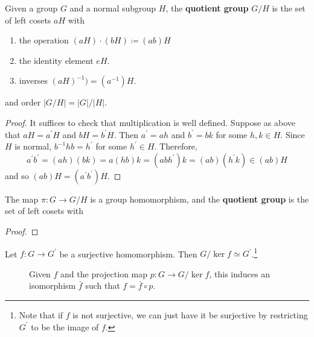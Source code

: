   \begin{definition}
    Given a group $G$ and a normal subgroup $H$, the \textbf{quotient group} $G/H$ is the set of left cosets $aH$ with 
    \begin{enumerate}
      \item the operation $(aH) \cdot (bH) \coloneqq (ab)H$ 
      \item the identity element $eH$. 
      \item inverses $(aH)^{-1}) = (a^{-1})H$. 
    \end{enumerate}
    and order $|G/H| = |G| / |H|$.  
  \end{definition}
  \begin{proof}
    It suffices to check that multiplication is well defined. Suppose as above that $aH = a^\prime H$ and $bH = b^\prime H$. Then $a^\prime = ah$ and $b^\prime = bk$ for some $h, k \in H$. Since $H$ is normal, $b^{-1} h b = h^\prime$ for some $h^\prime \in H$. Therefore, 
    \begin{equation}
      a^\prime b^\prime = (ah) (bk) = a(hb) k = (ab h^\prime) k = (ab)(h^\prime k) \in (ab) H
    \end{equation}
    and so $(ab)H = (a^\prime b^\prime)H$. 
  \end{proof}

  \begin{theorem}
    The map $\pi: G \rightarrow G/H$ is a group homomorphism, and the \textbf{quotient group} is the set of left cosets with 
  \end{theorem}
  \begin{proof}
    
  \end{proof} 

  \begin{theorem}
    Let $f: G \to G^\prime$ be a surjective homomorphism. Then $G/{\ker{f}} \simeq G^\prime$.\footnote{Note that if $f$ is not surjective, we can just have it be surjective by restricting $G^\prime$ to be the image of $f$. }

    \begin{figure}[H]
      \centering 
      \caption{Given $f$ and the projection map $p: G \to G/{\ker{f}}$, this induces an isomorphism $\bar{f}$ such that $f = \bar{f} \circ p$.} 
      \label{fig:group_fund_homo_theorem}
    \end{figure}
  \end{theorem}

